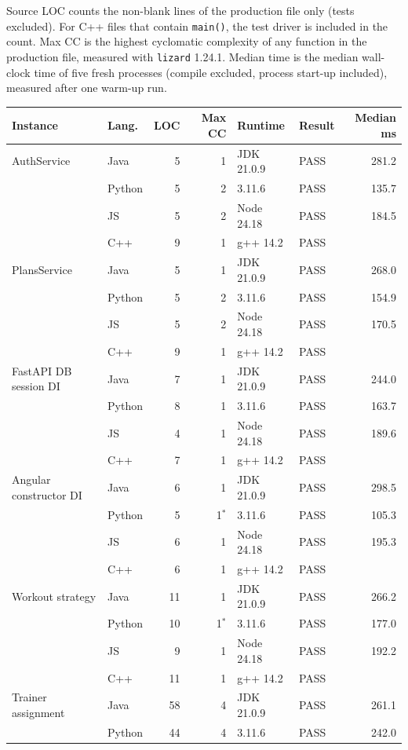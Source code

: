 \documentclass[11pt,a4paper]{article}
\begin{document}
Source LOC counts the non-blank lines of the production file only (tests excluded). For C++ files that contain \texttt{main()}, the test driver is included in the count. Max CC is the highest cyclomatic complexity of any function in the production file, measured with \texttt{lizard} 1.24.1. Median time is the median wall-clock time of five fresh processes (compile excluded, process start-up included), measured after one warm-up run.

{\small
\begin{longtable}{@{}llrrll r@{}}
\toprule
Instance & Lang. & LOC & Max CC & Runtime & Result & Median ms\\
\midrule
\endhead
AuthService & Java & 5 & 1 & JDK 21.0.9 & PASS & 281.2\\
 & Python & 5 & 2 & 3.11.6 & PASS & 135.7\\
 & JS & 5 & 2 & Node 24.18 & PASS & 184.5\\
 & C++ & 9 & 1 & g++ 14.2 & PASS & \\
\midrule
PlansService & Java & 5 & 1 & JDK 21.0.9 & PASS & 268.0\\
 & Python & 5 & 2 & 3.11.6 & PASS & 154.9\\
 & JS & 5 & 2 & Node 24.18 & PASS & 170.5\\
 & C++ & 9 & 1 & g++ 14.2 & PASS & \\
\midrule
FastAPI DB session DI & Java & 7 & 1 & JDK 21.0.9 & PASS & 244.0\\
 & Python & 8 & 1 & 3.11.6 & PASS & 163.7\\
 & JS & 4 & 1 & Node 24.18 & PASS & 189.6\\
 & C++ & 7 & 1 & g++ 14.2 & PASS & \\
\midrule
Angular constructor DI & Java & 6 & 1 & JDK 21.0.9 & PASS & 298.5\\
 & Python & 5 & 1$^{*}$ & 3.11.6 & PASS & 105.3\\
 & JS & 6 & 1 & Node 24.18 & PASS & 195.3\\
 & C++ & 6 & 1 & g++ 14.2 & PASS& \\
\midrule
Workout strategy & Java & 11 & 1 & JDK 21.0.9 & PASS & 266.2\\
 & Python & 10 & 1$^{*}$ & 3.11.6 & PASS & 177.0\\
 & JS & 9 & 1 & Node 24.18 & PASS & 192.2\\
 & C++ & 11 & 1 & g++ 14.2 & PASS & \\
\midrule
Trainer assignment & Java & 58 & 4 & JDK 21.0.9 & PASS & 261.1\\
 & Python & 44 & 4 & 3.11.6 & PASS & 242.0\\

\end{longtable}}
\end{document}
